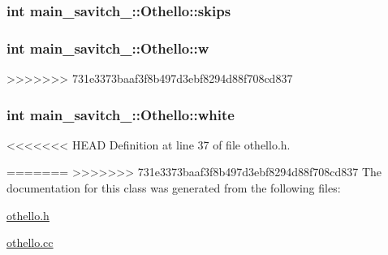 \subsubsection[{\texorpdfstring{skips}{skips}}]{\setlength{\rightskip}{0pt plus 5cm}int main\+\_\+savitch\+\_\+::\+Othello\+::skips\hspace{0.3cm}{\ttfamily [protected]}}\hypertarget{classmain__savitch__14_1_1_othello_a85d4ce17512d8dbf85a313a27eea0644}{}\label{classmain__savitch__14_1_1_othello_a85d4ce17512d8dbf85a313a27eea0644}
\subsubsection[{\texorpdfstring{w}{w}}]{\setlength{\rightskip}{0pt plus 5cm}int main\+\_\+savitch\+\_\+::\+Othello\+::w\hspace{0.3cm}{\ttfamily [protected]}}\hypertarget{classmain__savitch__14_1_1_othello_a1b11c5fe33e30a94ed39e8cb55caf37e}{}\label{classmain__savitch__14_1_1_othello_a1b11c5fe33e30a94ed39e8cb55caf37e}
>>>>>>> 731e3373baaf3f8b497d3ebf8294d88f708cd837
\subsubsection[{\texorpdfstring{white}{white}}]{\setlength{\rightskip}{0pt plus 5cm}int main\+\_\+savitch\+\_\+::\+Othello\+::white\hspace{0.3cm}{\ttfamily [protected]}}\hypertarget{classmain__savitch__14_1_1_othello_a7d5f59b1e581ed7a8145debeecf4f310}{}\label{classmain__savitch__14_1_1_othello_a7d5f59b1e581ed7a8145debeecf4f310}


<<<<<<< HEAD
Definition at line 37 of file othello.\+h.



=======
>>>>>>> 731e3373baaf3f8b497d3ebf8294d88f708cd837
The documentation for this class was generated from the following files\+:\begin{DoxyCompactItemize}
\item 
\hyperlink{othello_8h}{othello.\+h}\item 
\hyperlink{othello_8cc}{othello.\+cc}\end{DoxyCompactItemize}
